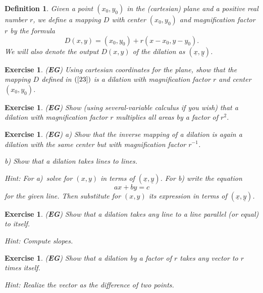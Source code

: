 \documentclass{article}%
\newtheorem{definition}[theorem]{Definition}
\newtheorem{exercise}[theorem]{Exercise}
\begin{document}
\begin{definition}
Given a point $\left(  x_{0},y_{0}\right)  $ in the (cartesian) plane and a
positive real number $r$, we define a mapping $D$ with center $\left(
x_{0},y_{0}\right)  $ and magnification factor $r$ by the formula%
\begin{equation}
D\left(  x,y\right)  =\left(  x_{0},y_{0}\right)  +r\left(  x-x_{0}%
,y-y_{0}\right)  . \label{23}%
\end{equation}
We will also denote the output $D\left(  x,y\right)  $ of the dilation as
$\left(  \underline{x},\underline{y}\right)  $.
\end{definition}

\begin{exercise}
(\textbf{EG}) Using cartesian coordinates for the plane, show that the mapping
$D$ defined in $\left(  \ref{23}\right)  $ is a dilation with magnification
factor $r$ and center $\left(  x_{0},y_{0}\right)  $.
\end{exercise}

\begin{exercise}
(\textbf{EG}) Show (using several-variable calculus if you wish) that a
dilation with magnification factor $r$ multiplies all areas by a factor of
$r^{2}$.
\end{exercise}

\begin{exercise}
(\textbf{EG}) a) Show that the inverse mapping of a dilation is again a
dilation with the same center but with magnification factor $r^{-1}$.

b) Show that a dilation takes lines to lines.

Hint: For a)\ solve for $\left(  x,y\right)  $ in terms of $\left(
\underline{x},\underline{y}\right)  $. For b) write the equation%
\[
ax+by=c
\]
for the given line. Then substitute for $\left(  x,y\right)  $ its expression
in terms of $\left(  \underline{x},\underline{y}\right)  $.
\end{exercise}

\begin{exercise}
(\textbf{EG}) Show that a dilation takes any line to a line parallel (or
equal) to itself.

Hint: Compute slopes.
\end{exercise}

\begin{exercise}
(\textbf{EG}) Show that a dilation by a factor of $r$ takes any vector to $r$
times itself.

Hint: Realize the vector as the difference of two points.
\end{exercise}
\end{document}
